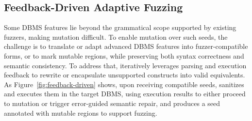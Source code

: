 \documentclass[sigconf,review,anonymous]{acmart}
\begin{document}
\subsection{Feedback-Driven Adaptive Fuzzing}%
\label{sec:mutation_loop}
Some DBMS features lie beyond the grammatical scope supported by existing fuzzers, making mutation difficult.
To enable mutation over such seeds, the challenge is to translate or adapt advanced DBMS features into fuzzer-compatible forms, or to mark mutable regions, while preserving both syntax correctness and semantic consistency.
To address that,
\tool{} iteratively leverages parsing and execution feedback to rewrite or encapsulate unsupported constructs into valid equivalents. 
As Figure~\ref{fig:feedback-driven} shows, upon receiving compatible seeds, \tool{} sanitizes and executes them in the target DBMS, using execution results to either proceed to mutation or trigger error-guided semantic repair, and produces a seed annotated with mutable regions to support fuzzing.
\end{document}
